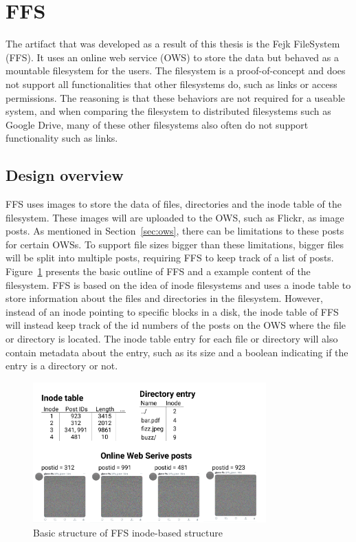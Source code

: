 \section{FFS}
The artifact that was developed as a result of this thesis is the Fejk FileSystem (FFS). It uses an online web service (OWS) to store the data but behaved as a mountable filesystem for the users. The filesystem is a proof-of-concept and does not support all functionalities that other filesystems do, such as links or access permissions. The reasoning is that these behaviors are not required for a useable system, and when comparing the filesystem to distributed filesystems such as Google Drive, many of these other filesystems also often do not support functionality such as links.

\subsection{Design overview}
FFS uses images to store the data of files, directories and the inode table of the filesystem. These images will are uploaded to the OWS, such as Flickr, as image posts. As mentioned in Section~\ref{sec:ows}, there can be limitations to these posts for certain OWSs. To support file sizes bigger than these limitations, bigger files will be split into multiple posts, requiring FFS to keep track of a list of posts. Figure~\ref{fig:ffs_inode_diag} presents the basic outline of FFS and a example content of the filesystem. FFS is based on the idea of inode filesystems and uses a inode table to store information about the files and directories in the filesystem. However, instead of an inode pointing to specific blocks in a disk, the inode table of FFS will instead keep track of the id numbers of the posts on the OWS where the file or directory is located. The inode table entry for each file or directory will also contain metadata about the entry, such as its size and a boolean indicating if the entry is a directory or not.

\begin{figure}[!ht]
	\begin{center}
	  \includegraphics[width=0.8\textwidth]{figures/ffs_inode_diagram.png}
	\end{center}
	\caption{Basic structure of FFS inode-based structure}
	\label{fig:ffs_inode_diag}
\end{figure}

